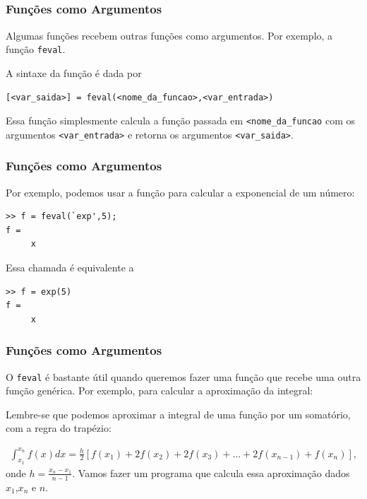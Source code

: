 \documentclass{beamer}
\begin{document}
\subsection[Fun\c{c}\~oes como Argumentos]{}

\begin{frame}[fragile]
\frametitle {Fun\c{c}\~oes como Argumentos}

Algumas fun\c{c}\~oes recebem outras fun\c{c}\~oes como argumentos. Por exemplo, a fun\c{c}\~ao {\tt feval}.
\pause

A sintaxe da fun\c{c}\~ao \'e dada por
\begin{verbatim}
[<var_saida>] = feval(<nome_da_funcao>,<var_entrada>)
\end{verbatim}
\pause

Essa fun\c{c}\~ao simplesmente calcula a fun\c{c}\~ao passada em {\tt <nome\_da\_funcao} com os argumentos  {\tt <var\_entrada>} e retorna os argumentos {\tt <var\_saida>}.

\end{frame}

\begin{frame}[fragile]
\frametitle {Fun\c{c}\~oes como Argumentos}

Por exemplo, podemos usar a fun\c{c}\~ao para calcular a exponencial de um n\'umero:
\pause
\begin{verbatim}
>> f = feval(`exp',5);
f =
     x
\end{verbatim}
\pause

Essa chamada \'e equivalente a
\pause

\begin{verbatim}
>> f = exp(5)
f =
     x
\end{verbatim}

\end{frame}

\begin{frame}
\frametitle {Fun\c{c}\~oes como Argumentos}

O {\tt feval} \'e bastante \'util quando queremos fazer uma fun\c{c}\~ao que recebe uma outra fun\c{c}\~ao gen\'erica. Por exemplo, para calcular a aproxima\c{c}\~ao da integral:
\pause

Lembre-se que podemos aproximar a integral de uma fun\c{c}\~ao por um somat\'orio, com a regra do trap\'ezio:
\pause

{\scriptsize
\begin{eqnarray*}
 \int_{x_1}^{x_n} f(x) dx = \frac{h}{2}[f(x_1)+2f(x_2)+2f(x_3)+\dots+2f(x_{n-1})+f(x_n)],
\end{eqnarray*}
}
onde $h = \frac{x_n-x_1}{n-1}$. Vamos fazer um programa que calcula essa aproxima\c{c}\~ao dados $x_1$,$x_n$ e $n$.

\end{frame}
\end{document}
